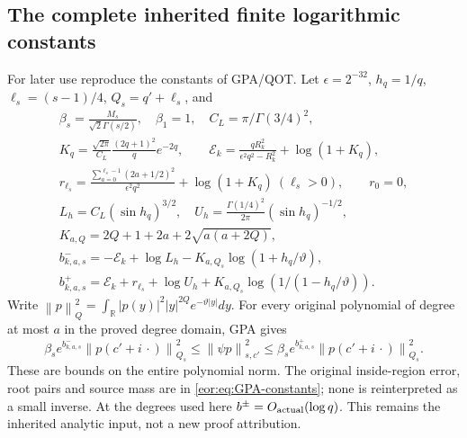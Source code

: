 \documentclass[11pt,a4paper]{article}
\newcommand{\R}{\mathbb R}
\newcommand{\norm}[1]{\left\lVert#1\right\rVert}
\begin{document}
\subsection{The complete inherited finite logarithmic constants}
For later use reproduce the constants of GPA/QOT. Let $\epsilon=2^{-32}$,
$h_q=1/q$, $\ell_s=(s-1)/4$, $Q_s=q'+\ell_s$, and
\begin{equation}
\begin{gathered}
 \beta_s=\frac{M_s}{\sqrt2\Gamma(s/2)},\quad\beta_1=1,
 \quad C_L=\pi/\Gamma(3/4)^2,\\
 K_q=\frac{\sqrt{2\pi}}{C_L}\frac{(2q+1)^2}{q}e^{-2q},\qquad
 \mathcal E_k=\frac{qR_k^2}{\epsilon^2q^2-R_k^2}+\log(1+K_q),\\
 r_{\ell_s}=\frac{\sum_{a=0}^{\ell_s-1}(2a+1/2)^2}{\epsilon^2q^2}
                  +\log(1+K_q)\ (\ell_s>0),\qquad r_0=0,\\
 L_h=C_L(\sin h_q)^{3/2},\quad
 U_h=\frac{\Gamma(1/4)^2}{2\pi}(\sin h_q)^{-1/2},\\
 K_{a,Q}=2Q+1+2a+2\sqrt{a(a+2Q)},\\
 b_{k,a,s}^{-}=-\mathcal E_k+\log L_h-K_{a,Q_s}\log(1+h_q/\vartheta),\\
 b_{k,a,s}^{+}=\mathcal E_k+r_{\ell_s}+\log U_h
                       +K_{a,Q_s}\log(1/(1-h_q/\vartheta)).
\end{gathered}\label{eor:eq:GPA-constants}
\end{equation}
Write
$\norm p_{Q}^2=\int_\R|p(y)|^2|y|^{2Q}e^{-\vartheta|y|}dy$.
For every original polynomial of degree at most $a$ in the proved degree domain,
GPA gives
\begin{equation}
 \beta_s e^{b_{k,a,s}^{-}}\norm{p(c'+i\,\cdot)}_{Q_s}^2
 \le\norm{\psi p}_{s,c'}^2
 \le\beta_s e^{b_{k,a,s}^{+}}\norm{p(c'+i\,\cdot)}_{Q_s}^2.
 \label{eor:eq:GPA}
\end{equation}
These are bounds on the entire polynomial norm. The original inside-region error,
root pairs and source mass are in \eqref{eor:eq:GPA-constants}; none is reinterpreted as
a small inverse. At the degrees used here $b^\pm=O_{\rm actual}(\log q)$.
This remains the inherited analytic input, not a new proof attribution.
\end{document}
